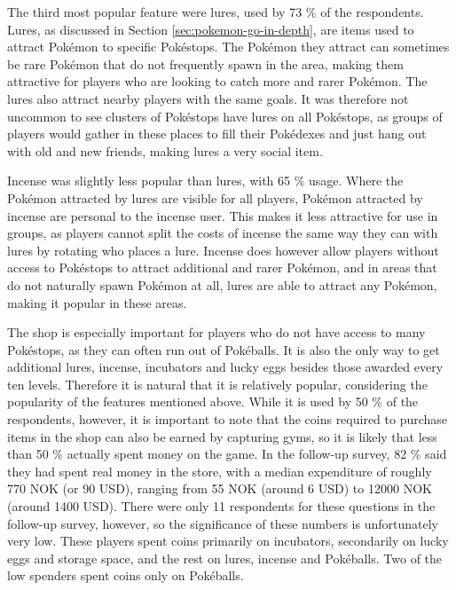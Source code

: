 The third most popular feature were lures, used by 73 \% of the respondents. Lures, as discussed in Section \ref{sec:pokemon-go-in-depth}, are items used to attract Pokémon to specific Pokéstops. The Pokémon they attract can sometimes be rare Pokémon that do not frequently spawn in the area, making them attractive for players who are looking to catch more and rarer Pokémon. The lures also attract nearby players with the same goals. It was therefore not uncommon to see clusters of Pokéstops have lures on all Pokéstops, as groups of players would gather in these places to fill their Pokédexes and just hang out with old and new friends, making lures a very social item.

Incense was slightly less popular than lures, with 65 \% usage. Where the Pokémon attracted by lures are visible for all players, Pokémon attracted by incense are personal to the incense user. This makes it less attractive for use in groups, as players cannot split the costs of incense the same way they can with lures by rotating who places a lure. Incense does however allow players without access to Pokéstops to attract additional and rarer Pokémon, and in areas that do not naturally spawn Pokémon at all, lures are able to attract any Pokémon, making it popular in these areas.

The shop is especially important for players who do not have access to many Pokéstops, as they can often run out of Pokéballs. It is also the only way to get additional lures, incense, incubators and lucky eggs besides those awarded every ten levels. Therefore it is natural that it is relatively popular, considering the popularity of the features mentioned above. While it is used by 50 \% of the respondents, however, it is important to note that the coins required to purchase items in the shop can also be earned by capturing gyms, so it is likely that less than 50 \% actually spent money on the game. In the follow-up survey, 82 \% said they had spent real money in the store, with a median expenditure of roughly 770 NOK (or 90 USD), ranging from 55 NOK (around 6 USD) to 12000 NOK (around 1400 USD). There were only 11 respondents for these questions in the follow-up survey, however, so the significance of these numbers is unfortunately very low. These players spent coins primarily on incubators, secondarily on lucky eggs and storage space, and the rest on lures, incense and Pokéballs. Two of the low spenders spent coins only on Pokéballs.

